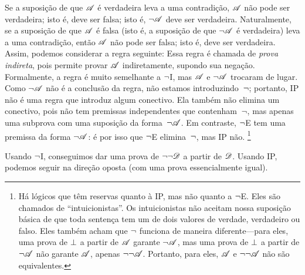 Se a suposição de que $\mathscr{A}$ é verdadeira leva a uma contradição, $\mathscr{A}$ não pode ser verdadeira; isto é, deve ser falsa; isto é, $\neg\mathscr{A}$ deve ser verdadeira. Naturalmente, se a suposição de que $\mathscr{A}$ é falsa (isto é, a suposição de que $\neg\mathscr{A}$ é verdadeira) leva a uma contradição, então $\mathscr{A}$ não pode ser falsa; isto é, deve ser verdadeira. Assim, podemos considerar a regra seguinte:
Essa regra é chamada de \emph{prova indireta}, pois permite provar $\mathscr{A}$ indiretamente, supondo sua negação. Formalmente, a regra é muito semelhante a $\neg$I, mas $\mathscr{A}$ e $\neg\mathscr{A}$ trocaram de lugar. Como $\neg\mathscr{A}$ não é a conclusão da regra, não estamos introduzindo~$\neg$; portanto, IP não é uma regra que introduz algum conectivo. Ela também não elimina um conectivo, pois não tem premissas independentes que contenham~$\neg$, mas apenas uma subprova com uma suposição da forma~$\neg\mathscr{A}$. Em contraste, $\neg$E tem uma premissa da forma $\neg\mathscr{A}$: é por isso que $\neg$E elimina~$\neg$, mas IP não.
\footnote{Há lógicos que têm reservas quanto à IP, mas não quanto a $\neg$E. Eles são chamados de \textquotedblleft{}intuicionistas\textquotedblright{}. Os intuicionistas não aceitam nossa suposição básica de que toda sentença tem um de dois valores de verdade, verdadeiro ou falso. Eles também acham que $\neg$ funciona de maneira diferente---para eles, uma prova de $\bot$ a partir de $\mathscr{A}$ garante $\neg \mathscr{A}$, mas uma prova de $\bot$ a partir de $\neg\mathscr{A}$ não garante $\mathscr{A}$, apenas $\neg\neg\mathscr{A}$. Portanto, para eles, $\mathscr{A}$ e $\neg\neg\mathscr{A}$ não são equivalentes.}

Usando $\neg$I, conseguimos dar uma prova de $\neg\neg\mathscr{D}$ a partir de $\mathscr{D}$. Usando IP, podemos seguir na direção oposta (com uma prova essencialmente igual).
	\begin{fitchproof}
		\PR
		\open
			\AS
		\close
	\end{fitchproof}

